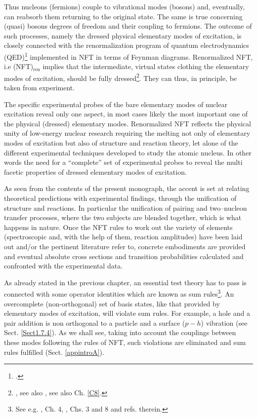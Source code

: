 
 Thus nucleons (fermions)  couple to  vibrational modes (bosons) and, eventually, can reabsorb them returning to the original state. The same is true concerning (quasi) bosons degrees of freedom and their coupling to fermions.  The outcome of such processes, namely the dressed physical elementary modes of excitation, is closely connected with the renormalization program of quantum electrodynamics (QED)\footnote{\cite{Feynman:75,Schwinger:01}.} implemented in NFT in terms of Feynman diagrams. Renormalized NFT, i.e (NFT)$_{\text{ren}}$ implies that the intermediate, virtual states clothing the elementary modes of excitation, should be fully dressed\footnote{\cite{Barranco:17}, see also \cite{Broglia:16}, see also Ch. \ref{C8}.}. They can thus, in principle, be taken from experiment. 
  
 
  The specific experimental probes of the bare elementary modes of nuclear excitation reveal only one aspect, in most cases likely the most important one of the physical (dressed) elementary modes. Renormalized NFT  reflects the physical unity of  low-energy nuclear research requiring the melting not only of elementary modes of excitation but also of structure and reaction theory, let alone of the different experimental techniques developed to study the atomic nucleus. In other words the need for a ``complete'' set of experimental probes to reveal the multi facetic properties of dressed elementary modes of excitation.

As  seen from the contents of the present monograph, the accent is set at relating theoretical predictions with experimental findings, through the unification of structure and reactions. In particular the unification of pairing and two--nucleon transfer processes, where the two subjects are blended together, which is what happens in nature.  Once the NFT rules to work out the variety of elements (spectroscopic and, with the help of them, reaction amplitudes) have been laid  out and/or the pertinent literature refer to, concrete embodiments are provided and eventual absolute cross sections and transition probabilities calculated and confronted with the experimental data. 


As already stated in the previous chapter, an essential test theory has to pass is connected  with some operator identities which are known as sum rules\footnote{See e.g. \cite{Bohr:75}, \cite{Bertsch:05} Ch. 4, \cite{Bortignon:98}, Chs. 3 and 8 and refs. therein.}. An overcomplete (non-orthogonal) set of basis states, like that provided by elementary modes of excitation, will violate sum rules. For example, a hole and a pair addition  is non orthogonal to a particle and a surface ($p-h$) vibration (see  Sect. \ref{Sect1.7.4}). As we shall see, taking into account the couplings between these modes following the rules of NFT,   such violations are eliminated and sum rules fulfilled (Sect. \ref{appintroA}).

